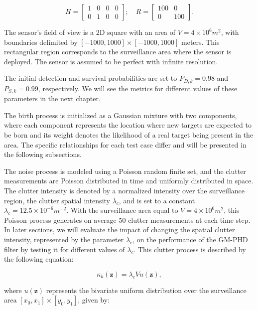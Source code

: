 \begin{equation}
    H =
    \begin{bmatrix}
        1 & 0 &0 & 0 \\
        0 & 1 &0 & 0
    \end{bmatrix};
    \quad
    R = \begin{bmatrix}
        100 & 0   \\
        0   & 100
    \end{bmatrix}.
\end{equation}

The sensor's field of view is a 2D square with an area of $V = 4 \times 10^6 m^2$, with boundaries delimited by $[-1000, 1000] \times [-1000, 1000]$ meters. This rectangular region corresponds to the surveillance area where the sensor is deployed. The sensor is assumed to be perfect with infinite resolution.

The initial detection and survival probabilities are set to $P_{D,k} = 0.98$ and $P_{S,k} = 0.99$, respectively. We will see the metrics for different values of these parameters in the next chapter.

The birth process is initialized as a Gaussian mixture with two components, where each component represents the location where new targets are expected to be born and its weight denotes the likelihood of a real target being present in the area. The specific relationships for each test case differ and will be presented in the following subsections.

The noise process is modeled using a Poisson random finite set, and the clutter measurements are Poisson distributed in time and uniformly distributed in space. The clutter intensity is denoted by a normalized intensity over the surveillance region, the clutter spatial intensity $\lambda_c$, and is set to a constant $\lambda_c = 12.5 \times 10^{-6} m^{-2}$. With the surveillance area equal to $V = 4 \times 10^6 m^2$, this Poisson process generates on average 50 clutter measurements at each time step. In later sections, we will evaluate the impact of changing the spatial clutter intensity, represented by the parameter $\lambda_c$, on the performance of the GM-PHD filter by testing it for different values of $\lambda_c$. This clutter process is described by the following equation:

\begin{equation}
\kappa_k(\mathbf{z}) = \lambda_c V u(\mathbf{z}),
\end{equation}

where $u(\mathbf{z})$ represents the bivariate uniform distribution over the surveillance area $[x_0, x_1] \times [y_0, y_1]$, given by:

